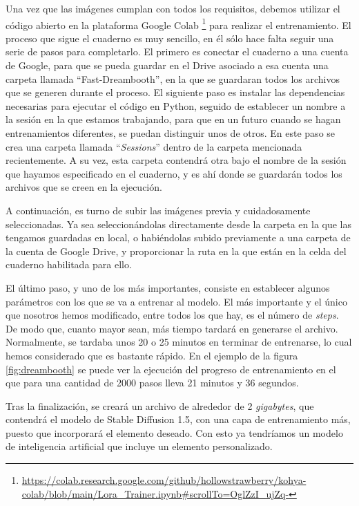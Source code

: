 Una vez que las imágenes cumplan con todos los requisitos, debemos utilizar el código abierto en la plataforma Google Colab \footnote{\url{https://colab.research.google.com/github/hollowstrawberry/kohya-colab/blob/main/Lora_Trainer.ipynb#scrollTo=OglZzI_ujZq-}} para realizar el entrenamiento. 
El proceso que sigue el cuaderno es muy sencillo, en él sólo hace falta seguir una serie de pasos para completarlo. El primero es conectar el cuaderno a una cuenta de Google, para que se pueda guardar en el Drive asociado a esa cuenta una carpeta llamada ``Fast-Dreambooth'', en la que se guardaran todos los archivos que se generen durante el proceso. El siguiente paso es instalar las dependencias necesarias para ejecutar el código en Python, seguido de establecer un nombre a la sesión en la que estamos trabajando, para que en un futuro cuando se hagan entrenamientos diferentes, se puedan distinguir unos de otros. En este paso se crea una carpeta llamada ``\textit{Sessions}'' dentro de la carpeta mencionada recientemente. A su vez, esta carpeta contendrá otra bajo el nombre de la sesión que hayamos especificado en el cuaderno, y es ahí donde se guardarán todos los archivos que se creen en la ejecución. 

A continuación, es turno de subir las imágenes previa y cuidadosamente seleccionadas. Ya sea seleccionándolas directamente desde la carpeta en la que las tengamos guardadas en local, o habiéndolas subido previamente a una carpeta de la cuenta de Google Drive, y proporcionar la ruta en la que están en la celda del cuaderno habilitada para ello. 

El último paso, y uno de los más importantes, consiste en establecer algunos parámetros con los que se va a entrenar al modelo. El más importante y el único que nosotros hemos modificado, entre todos los que hay, es el número de \textit{steps}. De modo que, cuanto mayor sean, más tiempo tardará en generarse el archivo. Normalmente, se tardaba unos 20 o 25 minutos en terminar de entrenarse, lo cual hemos considerado que es bastante rápido. En el ejemplo de la figura \ref{fig:dreambooth} se puede ver la ejecución del progreso de entrenamiento en el que para una cantidad de 2000 pasos lleva 21 minutos y 36 segundos. 

Tras la finalización, se creará un archivo de alrededor de 2 \textit{gigabytes}, que contendrá el modelo de Stable Diffusion 1.5, con una capa de entrenamiento más, puesto que incorporará el elemento deseado. Con esto ya tendríamos un modelo de inteligencia artificial que incluye un elemento personalizado.\\

